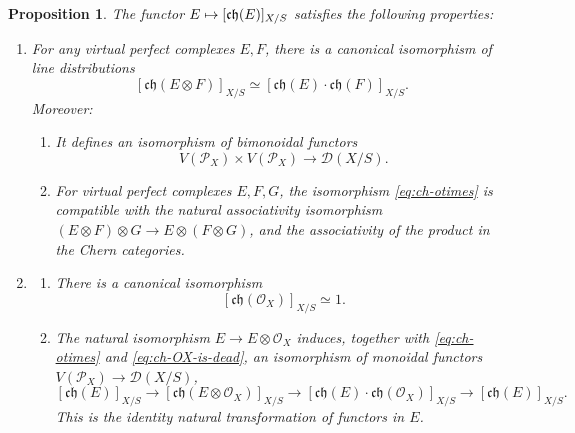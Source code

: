 \documentclass[11pt]{article}
\newcommand\mto{\mathchoice{\longmapsto}{\mapsto}{\mapsto}{\mapsto}}
\theoremstyle{plain}
\newtheorem{proposition}[theorem]{Proposition}
\theoremstyle{definition}
\newcommand{\Dcal}{\mathcal D}
\newcommand{\Ocal}{\mathcal O}
\newcommand{\Pcal}{\mathcal P}
\newcommand{\chfrak}{\mathfrak {ch}}
\begin{document}
\begin{proposition}\label{prop:ch-multiplicative-properties}
The functor $E\mto[\chfrak(E)]_{X/S}$ satisfies the following properties:
\begin{enumerate}
\item\label{item:chernsequence-5} For any virtual perfect complexes $E, F$, there is a canonical isomorphism of line distributions
\begin{equation}\label{eq:ch-otimes}
[\chfrak(E \otimes F)]_{X/S} \simeq [\chfrak(E) \cdot \chfrak(F)]_{X/S}.
\end{equation}
Moreover:
\begin{enumerate}
\item\label{eq:ch-otimes-a} It defines an isomorphism of bimonoidal functors
\[
V(\Pcal_{X})\times V(\Pcal_{X})\to\Dcal(X/S).
\]
\item For virtual perfect complexes $E,F,G$, the isomorphism \eqref{eq:ch-otimes} is compatible with the natural associativity isomorphism $(E\otimes F)\otimes G\to E\otimes (F\otimes G)$, and the associativity of the product in the Chern categories.
\end{enumerate}

\item \label{item:ch-is-the-unit}
\begin{enumerate}
\item\label{item:ch-acts-trivially} There is a canonical isomorphism
\begin{equation}\label{eq:ch-OX-is-dead}
[ \chfrak(\Ocal_{X}) ]_{X/S} \simeq 1.
\end{equation}
\item The natural isomorphism $E \to E \otimes \Ocal_X$ induces, together with \eqref{eq:ch-otimes} and \eqref{eq:ch-OX-is-dead}, an isomorphism of monoidal functors $V(\Pcal_X) \to \Dcal(X/S)$,
\begin{equation}\label{eq:OX-not-dead-yet}
[ \chfrak(E) ]_{X/S} \to [ \chfrak(E \otimes \Ocal_X) ]_{X/S} \to [\chfrak(E)\cdot \chfrak(\Ocal_X) ]_{X/S} \to [\chfrak(E)]_{X/S}.
\end{equation}
This is the identity natural transformation of functors in $E$.
\end{enumerate}

\end{enumerate}
\end{proposition}
\end{document}
